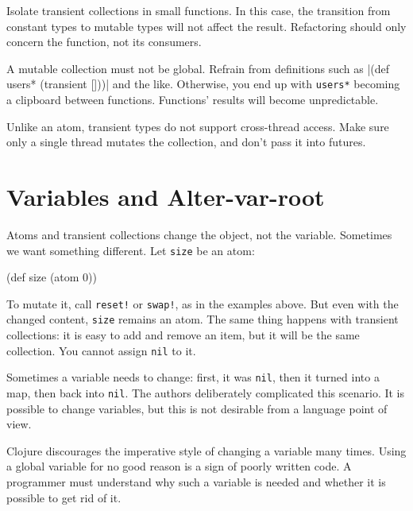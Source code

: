 Isolate transient collections in small functions.
In this case, the transition from constant types to mutable types will not affect the result.
Refactoring should only concern the function, not its consumers.

A mutable collection must not be global.
Refrain from definitions such as \spverb|(def users* (transient []))| and the like.
Otherwise, you end up with \verb|users*| becoming a clipboard between functions.
Functions' results will become unpredictable.

Unlike an atom, transient types do not support cross-thread access.
Make sure only a single thread mutates the collection, and don't pass it into futures.

\section{Variables and Alter-var-root}


\label{alter-var-root}

Atoms and transient collections change the object, not the variable.
Sometimes we want something different.
Let \verb|size| be an atom:

\begin{english}
  \begin{clojure}
(def size (atom 0))
  \end{clojure}
\end{english}

To mutate it, call \verb|reset!| or \verb|swap!|, as in the examples above.
But even with the changed content, \verb|size| remains an atom. The same thing happens with transient collections: it is easy to add and remove an item, but it will be the same collection.
You cannot assign \verb|nil| to it.

Sometimes a variable needs to change: first, it was \verb|nil|, then it turned into a map, then back into \verb|nil|.
The authors deliberately complicated this scenario.
It is possible to change variables, but this is not desirable from a language point of view.

Clojure discourages the imperative style of changing a variable many times.
Using a global variable for no good reason is a sign of poorly written code.
A programmer must understand why such a variable is needed and whether it is possible to get rid of it.


